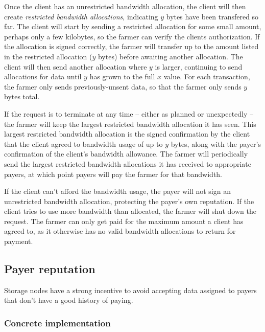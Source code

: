 \documentclass[a4paper,10pt]{article} \usepackage[utf8]{inputenc}
\begin{document}

Once the client has an unrestricted bandwidth allocation, the client will then
create {\em restricted bandwidth allocations}, 
indicating $y$ bytes have been transfered so far. The client
will start by sending a restricted allocation for some small amount, 
perhaps only a few kilobytes, 
so the farmer can verify the clients authorization.
If the allocation is signed correctly, the farmer will
transfer up to the amount listed in the restricted allocation ($y$ bytes) before
awaiting another allocation. The client will then send another allocation where
$y$ is larger, continuing to send allocations for data until $y$ has grown to
the full $x$ value. 
For each transaction, the farmer only sends previously-unsent data,
so that the farmer only sends $y$ bytes total.

If the request is to terminate at any time -- 
either as planned or unexpectedly --
the farmer will keep the largest restricted bandwidth allocation it has seen.
This largest restricted bandwidth allocation is the signed confirmation
by the client that the client agreed to bandwidth usage of up to $y$
bytes, along with the payer's confirmation of the client's bandwidth allowance.
The farmer will periodically send the largest restricted bandwidth
allocations it has received to appropriate payers, at which point
payers will pay the farmer for that bandwidth.

If the client can't afford the bandwidth usage, the payer will not sign an
unrestricted bandwidth allocation, protecting the payer's own reputation. 
If the client tries to use more bandwidth than allocated, 
the farmer will shut down the request. 
The farmer can only get paid for the maximum amount a client has agreed to, 
as it otherwise has no valid bandwidth allocations to return for
payment.

\subsection{Payer reputation}

Storage nodes have a strong incentive to avoid accepting data assigned to payers
that don't have a good history of paying.

\subsubsection{Concrete implementation}
\end{document}
